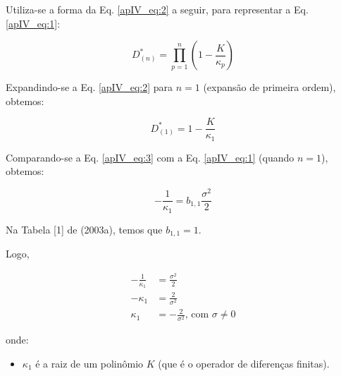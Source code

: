 Utiliza-se a forma da Eq. \ref{apIV_eq:2} a seguir, para representar a Eq. \ref{apIV_eq:1}:

\begin{equation}
\label{apIV_eq:2}
D^{*}_{(n)} = \prod_{p=1}^{n}{\left(1 - \frac{K}{\kappa_{p}}\right)}
\end{equation}

Expandindo-se a Eq. \ref{apIV_eq:2} para $n=1$ (expansão de primeira ordem), obtemos:

\begin{equation}
\label{apIV_eq:3}
D^{*}_{(1)} = 1 - \frac{K}{\kappa_{1}}
\end{equation}

Comparando-se a Eq. \ref{apIV_eq:3} com a Eq. \ref{apIV_eq:1} (quando $n=1$), obtemos:

\begin{equation}
\label{apIV_eq:4}
- \frac{1}{\kappa_{1}} = b_{1,1} \frac{\sigma^{2}}{2}
\end{equation}

Na Tabela [1] de  (2003a), temos que $b_{1,1} = 1$.

Logo,





\begin{align}
\label{apIV_eq:5}
- \frac{1}{\kappa_{1}} &= \frac{\sigma^{2}}{2} \\
- \kappa_{1} &= \frac{2}{\sigma^{2}} \\
\kappa_{1} &= - \frac{2}{\sigma^{2}} \text{, com $\sigma \neq 0$}
\end{align}

onde:

\begin{itemize}
	\item $\kappa_{1}$ é a raiz de um polinômio $K$ (que é o operador de diferenças finitas).
\end{itemize}

